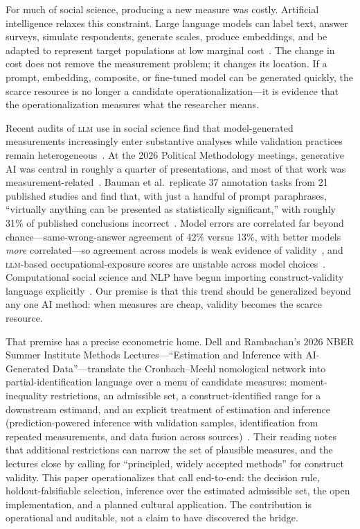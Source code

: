 \documentclass[10pt,letterpaper]{article}
\newcommand{\LLM}{\textsc{llm}}
\begin{document}
For much of social science, producing a new measure was costly.
Artificial intelligence relaxes this constraint.
Large language models can label text, answer surveys, simulate respondents, generate scales, produce embeddings, and be adapted to represent target populations at low marginal cost~\cite{horton2023,argyle2023,aher2023,manning2024,gilardi2023}.
The change in cost does not remove the measurement problem; it changes its location.
If a prompt, embedding, composite, or fine-tuned model can be generated quickly, the scarce resource is no longer a candidate operationalization---it is evidence that the operationalization measures what the researcher means.

Recent audits of \LLM{} use in social science find that model-generated measurements increasingly enter substantive analyses while validation practices remain heterogeneous~\cite{desai2026}.
At the 2026 Political Methodology meetings, generative AI was central in roughly a quarter of presentations, and most of that work was measurement-related~\cite{hall2026}.
Bauman et al.\ replicate 37 annotation tasks from 21 published studies and find that, with just a handful of prompt paraphrases, ``virtually anything can be presented as statistically significant,'' with roughly 31\% of published conclusions incorrect~\cite{bauman2026}.
Model errors are correlated far beyond chance---same-wrong-answer agreement of 42\% versus 13\%, with better models \emph{more} correlated---so agreement across models is weak evidence of validity~\cite{kim2025}, and \LLM-based occupational-exposure scores are unstable across model choices~\cite{yinvu2026}.
Computational social science and NLP have begun importing construct-validity language explicitly~\cite{proxy2026,halterman2024,bean2025}.
Our premise is that this trend should be generalized beyond any one AI method: when measures are cheap, validity becomes the scarce resource.

That premise has a precise econometric home.
Dell and Rambachan's 2026 NBER Summer Institute Methods Lectures---``Estimation and Inference with AI-Generated Data''---translate the Cronbach--Meehl nomological network into partial-identification language over a menu of candidate measures: moment-inequality restrictions, an admissible set, a construct-identified range for a downstream estimand, and an explicit treatment of estimation and inference (prediction-powered inference with validation samples, identification from repeated measurements, and data fusion across sources)~\cite{dellrambachan2026,cronbach1955}.
Their reading notes that additional restrictions can narrow the set of plausible measures, and the lectures close by calling for ``principled, widely accepted methods'' for construct validity.
This paper operationalizes that call end-to-end: the decision rule, holdout-falsifiable selection, inference over the estimated admissible set, the open implementation, and a planned cultural application.
The contribution is operational and auditable, not a claim to have discovered the bridge.
\end{document}
